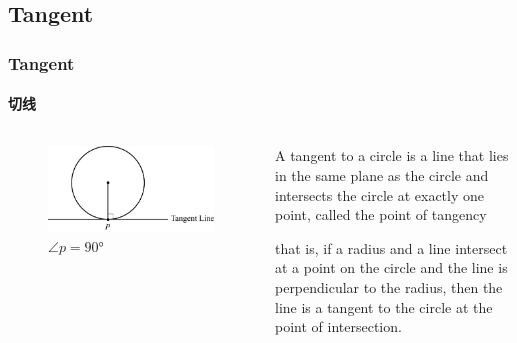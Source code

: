 \documentclass[
	11pt, %
]{beamer}
\begin{document}

\subsection{Tangent}


\begin{frame}
	\frametitle{Tangent} %
	\framesubtitle{切线}
			\begin{columns}[t] 
				\begin{column}{0.4\textwidth} %
					\begin{figure}
						\includegraphics[width=\linewidth]{Tangent.jpg}
						\caption{$\angle p = \ang{90}$}
					\end{figure}

				\end{column}
				\begin{column}{0.6\textwidth} %

				\begin{definition}
	A tangent to a circle is a line that lies in the same plane as the circle and
intersects the circle at exactly one point, called the point of tangency
				\end{definition}
				\begin{theorem}[切线和交点半径垂直]
					that is, if a radius
and a line intersect at a point on the circle and the line is perpendicular to the
radius, then the line is a tangent to the circle at the point of intersection.
				\end{theorem}
				\end{column}
			\end{columns}
\end{frame}
\end{document}
